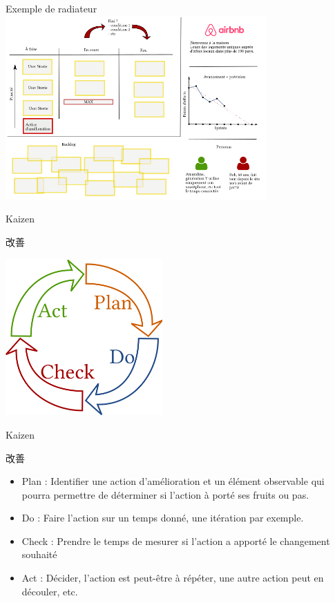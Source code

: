 \documentclass{beamer}
\begin{document}
\begin{frame}{Exemple de radiateur}
  \center
  \includegraphics[width=10cm]{includes/radiateur}
\end{frame}

\begin{frame}{Kaizen 
    {\begin{CJK*}{UTF8}{mj} 改善 \end{CJK*}}
  }
  \center
  \includegraphics[width=6cm]{includes/pdca}
\end{frame}

\begin{frame}{Kaizen 
    {\begin{CJK*}{UTF8}{mj} 改善 \end{CJK*}}
  }
  
  \begin{itemize}
    \item \alert{Plan} : Identifier une action d'amélioration et un élément observable qui pourra permettre de déterminer si l'action à porté ses fruits ou pas.
    \item \alert{Do} : Faire l'action sur un temps donné, une itération par exemple.
    \item \alert{Check} : Prendre le temps de mesurer si l'action a apporté le changement souhaité
    \item \alert{Act} : Décider, l'action est peut-être à répéter, une autre action peut en découler, etc.
  \end{itemize}

\end{frame}
\end{document}
